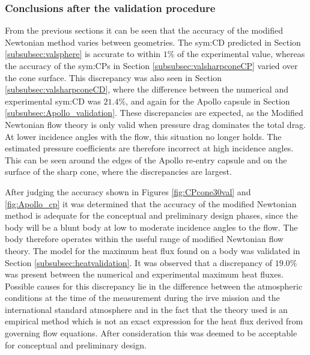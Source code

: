 \subsubsection{Conclusions after the validation procedure}
\label{subsec:validconclusions}
From the previous sections it can be seen that the accuracy of the modified Newtonian method varies between geometries. The \gls{sym:CD} predicted in Section \ref{subsubsec:valsphere} is accurate to within $1\%$ of the experimental value, whereas the accuracy of the \glspl{sym:CP} in Section \ref{subsubsec:valsharpconeCP} varied over the cone surface. This discrepancy was also seen in Section \ref{subsubsec:valsharpconeCD}, where the difference between the numerical and experimental \gls{sym:CD} was $21.4\%$, and again for the Apollo capsule in Section \ref{subsubsec:Apollo_validation}. These discrepancies are expected, as the Modified Newtonian flow theory is only valid when pressure drag dominates the total drag. At lower incidence angles with the flow, this situation no longer holds. The estimated pressure coefficients are therefore incorrect at high incidence angles. This can be seen around the edges of the Apollo re-entry capsule and on the surface of the sharp cone, where the discrepancies are largest.  

 After judging the accuracy shown in Figures \ref{fig:CPcone30val} and \ref{fig:Apollo_cp} it was determined that the accuracy of the modified Newtonian method is adequate for the conceptual and preliminary design phases, since the body will be a blunt body at low to moderate incidence angles to the flow. The body therefore operates within the useful range of modified Newtonian flow theory. 
The model for the maximum heat flux found on a body was validated in Section \ref{subsubsec:heatvalidation}. It was observed that a discrepancy of $19.0\%$ was present between the numerical and experimental maximum heat fluxes. Possible causes for this discrepancy lie in the difference between the atmospheric conditions at the time of the measurement during the \gls{irve} mission and the international standard atmosphere and in the fact that the theory used is an empirical method which is not an exact expression for the heat flux derived from governing flow equations.  After consideration this was deemed to be acceptable for conceptual and preliminary design.